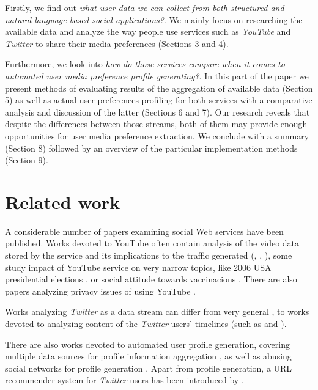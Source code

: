 \documentclass{article}
\begin{document}
Firstly, we find out \textit{what user data we can collect from both structured and natural language-based social applications?}. We mainly focus on researching the available data and analyze the way people use services such as
\textit{YouTube} and \textit{Twitter} to share their media preferences (Sections 3 and 4).

Furthermore, we look into \textit{how do those services compare when it comes to automated user media
preference profile generating?}. In this part of the paper we present methods of evaluating results of
the aggregation of available data (Section 5) as well as actual user preferences profiling for both
services with a comparative analysis and discussion of the latter (Sections 6 and 7). Our research reveals that despite the
differences between those streams, both of them may provide enough opportunities for user media preference
extraction. We conclude with a summary (Section 8) followed by an overview of the particular implementation methods (Section 9).

\section{Related work}

A considerable number of papers examining social Web services have been
published. Works devoted to YouTube often contain analysis of the video data
stored by the service and its implications to the traffic generated
(\cite{i-tube-you-tube}, \cite{views-from-the-edge},
\cite{statistics-and-social-network}), some study impact of YouTube service on
very narrow topics, like 2006 USA presidential elections
\cite{voters-myspace-youtube}, or social attitude towards vaccinacions
\cite{keelan}. There are also papers analyzing privacy issues of using YouTube
\cite{publicly-private}.

Works analyzing \textit{Twitter} as a data stream can differ from very general \cite{why-we-twitter},
to works devoted to analyzing content of the \textit{Twitter} users' timelines (such as \cite{twitter-content-is-it} and \cite{short-tweet}).

There are also works devoted to automated user profile generation, covering multiple data sources for profile
information aggregation \cite{public-profiles}, as well as abusing social networks for profile generation \cite{twitter-abuse}. Apart from profile generation, a URL recommender system for \textit{Twitter} users
has been introduced by \cite{short-tweet}.
\end{document}
